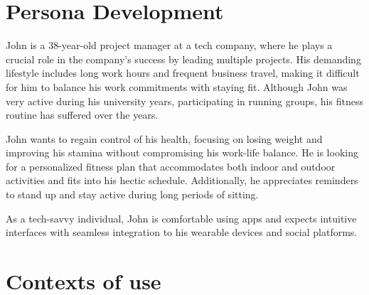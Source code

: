 \documentclass[letterpaper,11pt]{texMemo} %
\begin{document}
\maketitle %

\section{Persona Development}

John is a 38-year-old project manager at a tech company, where he plays a crucial role in the company's success by leading multiple projects. His demanding lifestyle includes long work hours and frequent business travel, making it difficult for him to balance his work commitments with staying fit. Although John was very active during his university years, participating in running groups, his fitness routine has suffered over the years.

John wants to regain control of his health, focusing on losing weight and improving his stamina without compromising his work-life balance. He is looking for a personalized fitness plan that accommodates both indoor and outdoor activities and fits into his hectic schedule. Additionally, he appreciates reminders to stand up and stay active during long periods of sitting.

As a tech-savvy individual, John is comfortable using apps and expects intuitive interfaces with seamless integration to his wearable devices and social platforms.


\section{Contexts of use}
\end{document}
